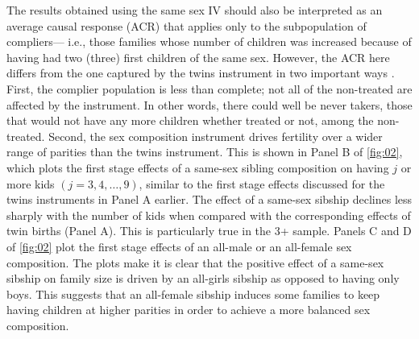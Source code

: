 The results obtained using the same sex IV should also be interpreted as an average causal response (ACR) that applies only to the subpopulation of compliers--- i.e., those families whose number of children was increased because of having had two (three) first children of the same sex. However, the ACR here differs from the one captured by the twins instrument in two important ways \parencite{angrist_multiple_2010}. First, the complier population is less than complete; not all of the non-treated are affected by the instrument. In other words, there could well be never takers, those that would not have any more children whether treated or not, among the non-treated. Second, the sex composition instrument drives fertility over a wider range of parities than the twins instrument. This is shown in Panel B of \autoref{fig:02}, which plots the first stage effects of a same-sex sibling composition on having $ j $ or more kids $ (j = 3, 4, \dots, 9) $, similar to the first stage effects discussed for the twins instruments in Panel A earlier. The effect of a same-sex sibship declines less sharply with the number of kids when compared with the corresponding effects of twin births (Panel A). This is particularly true in the 3+ sample. Panels C and D of \autoref{fig:02} plot the first stage effects of an all-male or an all-female sex composition. The plots make it is clear that the positive effect of a same-sex sibship on family size is driven by an all-girls sibship as opposed to having only boys. This suggests that an all-female sibship induces some families to keep having children at higher parities in order to achieve a more balanced sex composition. 


